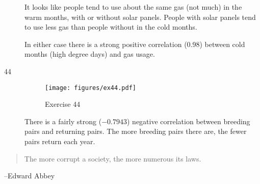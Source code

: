 \documentclass[letterpaper, landscape]{exam}
\begin{document}
\begin{description}
        It looks like people tend to use about the same gas (not much) in the
        warm months, with or without solar panels.  People with solar panels
        tend to use less gas than people without in the cold months.

        In either case there is a strong positive correlation (0.98) between
        cold months (high degree days) and gas usage.

      \item[44]
        \begin{figure}[H]
          \centering
          \texttt{[image: figures/ex44.pdf]}
          \caption{Exercise 44}
        \end{figure}

        There is a fairly strong ($-0.7943$) negative correlation between breeding
        pairs and returning pairs.  The more breeding pairs there are, the fewer
        pairs return each year.

    \end{description}


  \else
    \vspace{10 cm}
    \begin{quote}
      \begin{em}
        The more corrupt a society, the more numerous its laws.
      \end{em}
    \end{quote}
    \hspace{1 cm} --Edward Abbey
  \fi
\end{document}
